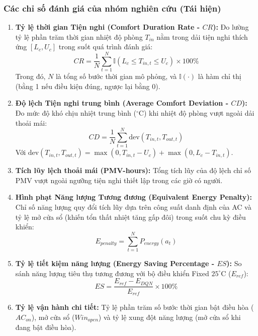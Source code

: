 \documentclass[12pt, a4paper]{report}
\begin{document}
\subsubsection{Các chỉ số đánh giá của nhóm nghiên cứu (Tái hiện)}
\begin{enumerate}
    \item \textbf{Tỷ lệ thời gian Tiện nghi (Comfort Duration Rate - $CR$):} Đo lường tỷ lệ phần trăm thời gian nhiệt độ phòng $T_{in}$ nằm trong dải tiện nghi thích ứng $[L_c, U_c]$ trong suốt quá trình đánh giá:
    \begin{equation}
    CR = \frac{1}{N} \sum_{t=1}^{N} \mathbb{I}\left(L_c \le T_{in, t} \le U_c\right) \times 100\%
    \end{equation}
    Trong đó, $N$ là tổng số bước thời gian mô phỏng, và $\mathbb{I}(\cdot)$ là hàm chỉ thị (bằng 1 nếu điều kiện đúng, ngược lại bằng 0).
    
    \item \textbf{Độ lệch Tiện nghi trung bình (Average Comfort Deviation - $CD$):} Đo mức độ khó chịu nhiệt trung bình ($^\circ\text{C}$) khi nhiệt độ phòng vượt ngoài dải thoải mái:
    \begin{equation}
    CD = \frac{1}{N} \sum_{t=1}^{N} \text{dev}(T_{in, t}, T_{out, t})
    \end{equation}
    Với $\text{dev}(T_{in, t}, T_{out, t}) = \max(0, T_{in, t} - U_c) + \max(0, L_c - T_{in, t})$.
    
    \item \textbf{Tích lũy lệch thoải mái (PMV-hours):} Tổng tích lũy của độ lệch chỉ số PMV vượt ngoài ngưỡng tiện nghi thiết lập trong các giờ có người.
    
    \item \textbf{Hình phạt Năng lượng Tương đương (Equivalent Energy Penalty):} Chỉ số năng lượng quy đổi tích lũy dựa trên công suất danh định của AC và tỷ lệ mở cửa sổ (khiến tổn thất nhiệt tăng gấp đôi) trong suốt chu kỳ điều khiển:
    \begin{equation}
    E_{penalty} = \sum_{t=1}^{N} P_{energy}(a_t)
    \end{equation}
    
    \item \textbf{Tỷ lệ tiết kiệm năng lượng (Energy Saving Percentage - $ES$):} So sánh năng lượng tiêu thụ tương đương với bộ điều khiển Fixed $25^\circ\text{C}$ ($E_{ref}$):
    \begin{equation}
    ES = \frac{E_{ref} - E_{DQN}}{E_{ref}} \times 100\%
    \end{equation}
    
    \item \textbf{Tỷ lệ vận hành chi tiết:} Tỷ lệ phần trăm số bước thời gian bật điều hòa ($AC_{on}$), mở cửa sổ ($Win_{open}$) và tỷ lệ xung đột năng lượng (mở cửa sổ khi đang bật điều hòa).
\end{enumerate}
\end{document}
